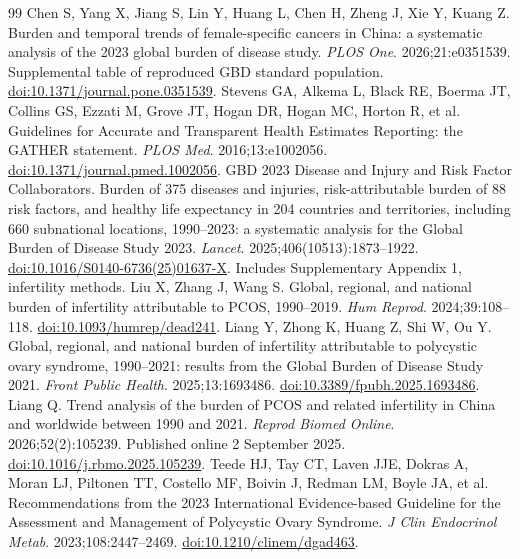 \documentclass[11pt,a4paper]{article}
\begin{document}
{\small{}
\begin{thebibliography}{99}
 Chen S, Yang X, Jiang S, Lin Y, Huang L, Chen H, Zheng J, Xie Y, Kuang Z. Burden and temporal trends of female-specific cancers in China: a systematic analysis of the 2023 global burden of disease study. \emph{PLOS One}. 2026;21:e0351539. Supplemental table of reproduced GBD standard population. \href{https://doi.org/10.1371/journal.pone.0351539}{doi:10.1371/journal.pone.0351539}.
 Stevens GA, Alkema L, Black RE, Boerma JT, Collins GS, Ezzati M, Grove JT, Hogan DR, Hogan MC, Horton R, et al. Guidelines for Accurate and Transparent Health Estimates Reporting: the GATHER statement. \emph{PLOS Med}. 2016;13:e1002056. \href{https://doi.org/10.1371/journal.pmed.1002056}{doi:10.1371/journal.pmed.1002056}.
 GBD 2023 Disease and Injury and Risk Factor Collaborators. Burden of 375 diseases and injuries, risk-attributable burden of 88 risk factors, and healthy life expectancy in 204 countries and territories, including 660 subnational locations, 1990--2023: a systematic analysis for the Global Burden of Disease Study 2023. \emph{Lancet}. 2025;406(10513):1873--1922. \href{https://doi.org/10.1016/S0140-6736(25)01637-X}{doi:10.1016/S0140-6736(25)01637-X}. Includes Supplementary Appendix 1, infertility methods.
 Liu X, Zhang J, Wang S. Global, regional, and national burden of infertility attributable to PCOS, 1990--2019. \emph{Hum Reprod}. 2024;39:108--118. \href{https://doi.org/10.1093/humrep/dead241}{doi:10.1093/humrep/dead241}.
 Liang Y, Zhong K, Huang Z, Shi W, Ou Y. Global, regional, and national burden of infertility attributable to polycystic ovary syndrome, 1990--2021: results from the Global Burden of Disease Study 2021. \emph{Front Public Health}. 2025;13:1693486. \href{https://doi.org/10.3389/fpubh.2025.1693486}{doi:10.3389/fpubh.2025.1693486}.
 Liang Q. Trend analysis of the burden of PCOS and related infertility in China and worldwide between 1990 and 2021. \emph{Reprod Biomed Online}. 2026;52(2):105239. Published online 2 September 2025. \href{https://doi.org/10.1016/j.rbmo.2025.105239}{doi:10.1016/j.rbmo.2025.105239}.
Teede HJ, Tay CT, Laven JJE, Dokras A, Moran LJ, Piltonen TT, Costello MF, Boivin J, Redman LM, Boyle JA, et al. Recommendations from the 2023 International Evidence-based Guideline for the Assessment and Management of Polycystic Ovary Syndrome. \emph{J Clin Endocrinol Metab}. 2023;108:2447--2469. \href{https://doi.org/10.1210/clinem/dgad463}{doi:10.1210/clinem/dgad463}.

\end{thebibliography}}
\end{document}
